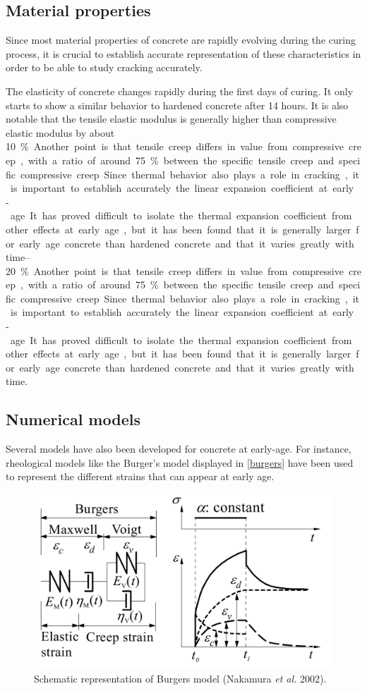\documentclass[a4paper,11pt]{memoir}
\begin{document}
\subsection{Material properties}
Since most material properties of concrete are rapidly evolving during the
curing process, it is crucial to establish accurate representation of these
characteristics in order to be able to study cracking accurately.

The elasticity of concrete changes rapidly during the first days of curing. It
only starts to show a similar behavior to hardened concrete after 14 hours.
It is also notable that the tensile elastic modulus is generally higher than
compressive elastic modulus by about \SIrange{10}{20}\percent.

Another point is that tensile creep differs in value from compressive creep,
with a ratio of around \SI{75}\percent between the specific tensile creep and
specific compressive creep.

Since thermal behavior also plays a role in cracking, it is important to
establish accurately the linear expansion coefficient at early-age. It has
proved difficult to isolate the thermal expansion coefficient from other
effects at early age, but it has been found that it is generally larger for
early age concrete than hardened concrete and that it varies greatly with time.

\subsection{Numerical models}

Several models have also been developed for concrete at early-age. For
instance, rheological models like the Burger's model displayed in
\autoref{burgers} have been used to represent the different strains that can
appear at early age.

\begin{figure}
  \centering
  \includegraphics[width=.5\linewidth]{burgers}
  \caption{Schematic representation of Burgers model (Nakamura \textit{et al.}
  2002).}\label{burgers}
\end{figure}
\end{document}
